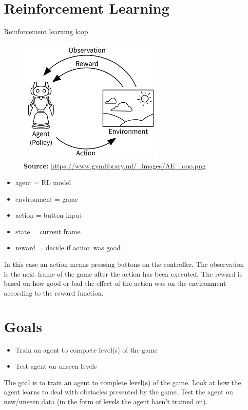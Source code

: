 \documentclass{article}
\begin{document}
    \section{Reinforcement Learning}
    Reinforcement learning loop
    \begin{figure}[H]
        \centering
        \includegraphics[width=0.65\textwidth]{AE_loop}
        \caption{\textbf{Source:} \url{https://www.gymlibrary.ml/_images/AE_loop.png}}
        \label{fig:loop}
    \end{figure}
    \begin{itemize}
        \item agent = RL model
        \item environment = game
        \item action = button input
        \item state = current frame
        \item reward = decide if action was good
    \end{itemize}
    In this case an action means pressing buttons on the controller.
    The observation is the next frame of the game after the action has been executed.
    The reward is based on how good or bad the effect of the action was on the environment according to the reward function.

    \section{Goals}
    \begin{itemize}
        \item Train an agent to complete level(s) of the game
        \item Test agent on unseen levels
    \end{itemize}
    The goal is to train an agent to complete level(s) of the game.
    Look at how the agent learns to deal with obstacles presented by the game.
    Test the agent on new/unseen data (in the form of levels the agent hasn't trained on).
\end{document}
